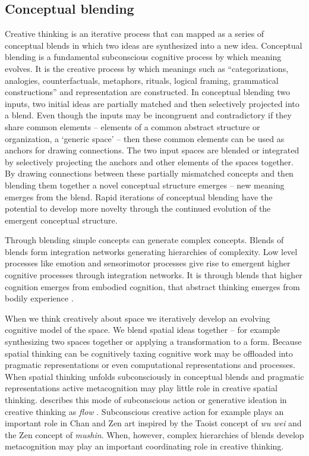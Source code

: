 \documentclass{article}
\begin{document}
\subsection{Conceptual blending}
Creative thinking is an iterative process that can mapped as a series of conceptual blends 
in which two ideas are synthesized into a new idea. 
Conceptual blending is a fundamental subconscious cognitive process by which meaning evolves.
It is the creative process by which meanings such as ``categorizations, analogies, counterfactuals, metaphors, rituals, logical framing, grammatical
constructions'' \citep{Fauconnier2000} and representation are constructed.
In conceptual blending two inputs, two initial ideas are partially matched and then selectively projected into a blend. 
Even though the inputs may be incongruent and contradictory if they share common elements -- elements of a common abstract structure or organization, a `generic space' --  then these common elements can be used as anchors for drawing connections. 
The two input spaces are blended or integrated by selectively projecting the anchors and other elements of the spaces together.
By drawing connections between these partially mismatched concepts and then blending them together a novel conceptual structure emerges \citep{Fauconnier2000} -- new meaning emerges from the blend. 
 Rapid iterations of conceptual blending have the potential to develop 
more novelty through the continued evolution of the emergent conceptual structure.
 
Through blending simple concepts can generate complex concepts. 
Blends of blends form integration networks generating hierarchies of complexity. 
Low level processes like emotion and sensorimotor processes give rise to emergent higher cognitive processes through integration networks. It is through blends that higher cognition emerges from embodied cognition,
that abstract thinking emerges from bodily experience \citep{Jetter2014}. 

When we think creatively about space 
we iteratively develop an evolving cognitive model of the space. 
We blend spatial ideas together 
-- for example synthesizing two spaces together or applying a transformation to a form.
Because spatial thinking can be cognitively taxing
cognitive work may be offloaded into pragmatic representations 
or even computational representations and processes. 
When spatial thinking unfolds  
subconsciously in conceptual blends and pragmatic representations
active metacognition may play little role in creative spatial thinking. 
\citeauthor{Csikszentmihalyi1996} describes this mode of subconscious action 
or generative ideation in creative thinking as
\emph{flow} \citeyearpar{Csikszentmihalyi1996}. 
Subconscious creative action for example plays an important role in Chan and Zen art
inspired by the Taoist concept of \emph{wu wei} and the Zen concept of 
\emph{mushin}. 
When, however, complex hierarchies of blends develop 
metacognition may play an important coordinating role in creative thinking. 
\end{document}
